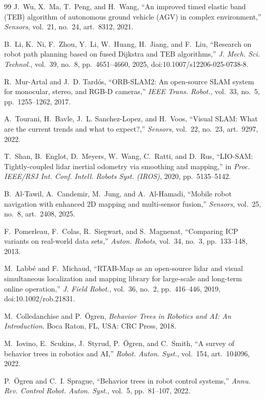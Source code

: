 \documentclass[conference]{IEEEtran}
\begin{document}
\begin{thebibliography}{99}
J.~Wu, X.~Ma, T.~Peng, and H.~Wang, ``An improved timed elastic band (TEB) algorithm of autonomous ground vehicle (AGV) in complex environment,'' \emph{Sensors}, vol.~21, no.~24, art.~8312, 2021.

B.~Li, K.~Ni, F.~Zhou, Y.~Li, W.~Huang, H.~Jiang, and F.~Liu, ``Research on robot path planning based on fused Dijkstra and TEB algorithms,'' \emph{J. Mech. Sci. Technol.}, vol.~39, no.~8, pp.~4651--4660, 2025, doi:10.1007/s12206-025-0738-8.

R.~Mur-Artal and J.~D. Tard\'os, ``ORB-SLAM2: An open-source SLAM system for monocular, stereo, and RGB-D cameras,'' \emph{IEEE Trans. Robot.}, vol.~33, no.~5, pp.~1255--1262, 2017.

A.~Tourani, H.~Bavle, J.~L. Sanchez-Lopez, and H.~Voos, ``Visual SLAM: What are the current trends and what to expect?,'' \emph{Sensors}, vol.~22, no.~23, art.~9297, 2022.

T.~Shan, B.~Englot, D.~Meyers, W.~Wang, C.~Ratti, and D.~Rus, ``LIO-SAM: Tightly-coupled lidar inertial odometry via smoothing and mapping,'' in \emph{Proc. IEEE/RSJ Int. Conf. Intell. Robots Syst. (IROS)}, 2020, pp.~5135--5142.

B.~Al-Tawil, A.~Candemir, M.~Jung, and A.~Al-Hamadi, ``Mobile robot navigation with enhanced 2D mapping and multi-sensor fusion,'' \emph{Sensors}, vol.~25, no.~8, art.~2408, 2025.

F.~Pomerleau, F.~Colas, R.~Siegwart, and S.~Magnenat, ``Comparing ICP variants on real-world data sets,'' \emph{Auton. Robots}, vol.~34, no.~3, pp.~133--148, 2013.

M.~Labb\'e and F.~Michaud, ``RTAB-Map as an open-source lidar and visual simultaneous localization and mapping library for large-scale and long-term online operation,'' \emph{J. Field Robot.}, vol.~36, no.~2, pp.~416--446, 2019, doi:10.1002/rob.21831.

M.~Colledanchise and P.~\"Ogren, \emph{Behavior Trees in Robotics and AI: An Introduction}. Boca Raton, FL, USA: CRC Press, 2018.

M.~Iovino, E.~Scukins, J.~Styrud, P.~\"Ogren, and C.~Smith, ``A survey of behavior trees in robotics and AI,'' \emph{Robot. Auton. Syst.}, vol.~154, art.~104096, 2022.

P.~\"Ogren and C.~I. Sprague, ``Behavior trees in robot control systems,'' \emph{Annu. Rev. Control Robot. Auton. Syst.}, vol.~5, pp.~81--107, 2022.


\end{thebibliography}
\end{document}

